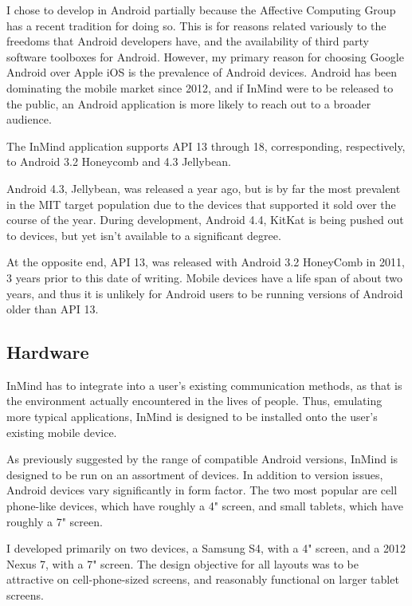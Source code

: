     I chose to develop in Android partially because the Affective Computing Group
    has a recent tradition for doing so.
    This is for reasons related variously to the freedoms that Android developers have,
    and the availability of third party software toolboxes for Android.
    However, my primary reason for choosing Google Android over Apple iOS is
    the prevalence of Android devices.
    Android has been dominating the mobile market since 2012,
    and if InMind were to be released to the public,
    an Android application is more likely to reach out to a broader audience.

    The InMind application supports API 13 through 18, 
    corresponding, respectively, to Android 3.2 Honeycomb and 4.3 Jellybean.

    Android 4.3, Jellybean, was released a year ago, but is by far
    the most prevalent in the MIT target population due to the devices
    that supported it sold over the course of the year.
    During development, Android 4.4, KitKat is being pushed out to devices,
    but yet isn't available to a significant degree.

    At the opposite end, API 13, was released with Android 3.2 HoneyComb
    in 2011, 3 years prior to this date of writing.
    Mobile devices have a life span of about two years,
    and thus it is unlikely for Android users to be
    running versions of Android older than API 13.

    \subsection{Hardware}
    InMind has to integrate into a user's existing communication methods,
    as that is the environment actually encountered in the lives of people.
    Thus, emulating more typical applications,
    InMind is designed to be installed onto the user's existing mobile device.

    As previously suggested by the range of compatible Android versions,
    InMind is designed to be run on an assortment of devices.
    In addition to version issues, Android devices vary significantly in form factor.
    The two most popular are cell phone-like devices, which have roughly a 4" screen,
    and small tablets, which have roughly a 7" screen.

    I developed primarily on two devices, a Samsung S4, with a 4" screen,
    and a 2012 Nexus 7, with a 7" screen.
    The design objective for all layouts was to be attractive on cell-phone-sized screens,
    and reasonably functional on larger tablet screens.

